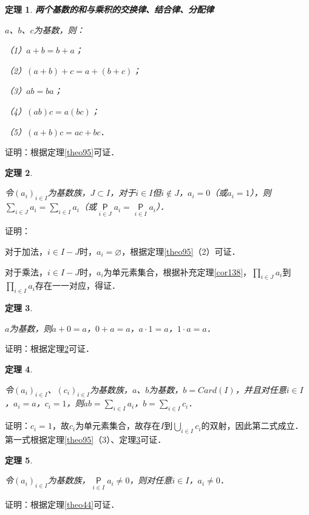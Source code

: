 \documentclass[12pt, a4paper, oneside]{book}
\newtheorem{theo}{定理}
\begin{document}
			\begin{theo}\label{theo96}
				\textbf{两个基数的和与乘积的交换律、结合律、分配律}
				\par
				$a$、$b$、$c$为基数，则：
				\par
				（1）$a+b=b+a$；
				\par
				（2）$(a+b)+c=a+(b+c)$；
				\par
				（3）$ab=ba$；
				\par
				（4）$(ab)c=a(bc)$；
				\par
				（5）$(a+b)c=ac+bc$．
			\end{theo}
			证明：根据定理\ref{theo95}可证．
			
			\begin{theo}\label{theo97}
				\hfill\par
				令$(a_i)_{i\in I}$为基数族，$J\subset I$，对于$i\in I$但$i\notin J$，$a_i=0$（或$a_i=1$），则$\sum\limits_{i\in J}a_i=\sum\limits_{i\in I}a_i$（或$\mathop{\mathsf{P}}\limits_{i\in J}a_i=\mathop{\mathsf{P}}\limits_{i\in I}a_i$）．
			\end{theo}
			证明：
			\par
			对于加法，$i\in I-J$时，$a_i=\varnothing$，根据定理\ref{theo95}（2）可证．
			\par
			对于乘法，$i\in I-J$时，$a_i$为单元素集合，根据补充定理\ref{cor138}，$\prod\limits_{i\in J}a_i$到$\prod\limits_{i\in I}a_i$存在一一对应，得证．
						
			\begin{theo}\label{theo98}
				\hfill\par
				$a$为基数，则$a+0=a$，$0+a=a$，$a\cdot 1=a$，$1\cdot a=a$．
			\end{theo}
			证明：根据定理\ref{theo97}可证．
						
			\begin{theo}\label{theo99}
				\hfill\par
				令$(a_i)_{i\in I}$、$(c_i)_{i\in I}$为基数族，$a$、$b$为基数，$b=Card(I)$，并且对任意$i\in I$，$a_i=a$，$c_i=1$，则$ab=\sum\limits_{i\in I}a_i$，$b=\sum\limits_{i\in I}c_i$．
			\end{theo}
			证明：$c_i=1$，故$c_i$为单元素集合，故存在$I$到$\bigcup\limits_{i\in I}c_i$的双射，因此第二式成立．第一式根据定理\ref{theo95}（3）、定理\ref{theo98}可证．
						
			\begin{theo}\label{theo100}
				\hfill\par
				令$(a_i)_{i\in I}$为基数族，$\mathop{\mathsf{P}}\limits_{i\in I}a_i\neq 0$，则对任意$i\in I$，$a_i\neq 0$．
			\end{theo}
			证明：根据定理\ref{theo44}可证．
						
\end{document}
